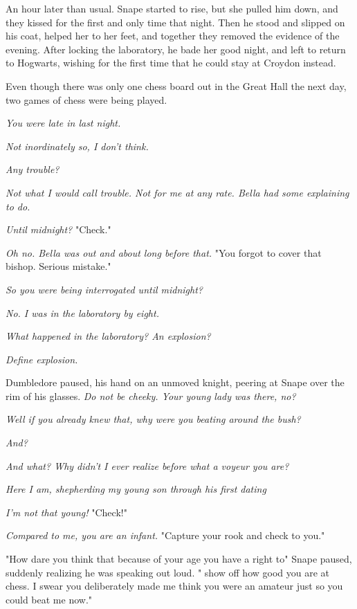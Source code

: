 An hour later than usual. Snape started to rise, but she pulled him down, and they kissed for the first and only time that night. Then he stood and slipped on his coat, helped her to her feet, and together they removed the evidence of the evening. After locking the laboratory, he bade her good night, and left to return to Hogwarts, wishing for the first time that he could stay at Croydon instead.

Even though there was only one chess board out in the Great Hall the next day, two games of chess were being played.

\emph{You were late in last night.}

\emph{Not inordinately so, I don't think.}

\emph{Any trouble?}

\emph{Not what I would call trouble. Not for me at any rate. Bella had some explaining to do.}

\emph{Until midnight?} "Check."

\emph{Oh no. Bella was out and about long before that.} "You forgot to cover that bishop. Serious mistake."

\emph{So you were being interrogated until midnight?}

\emph{No. I was in the laboratory by eight.}

\emph{What happened in the laboratory? An explosion?}

\emph{Define explosion.}

Dumbledore paused, his hand on an unmoved knight, peering at Snape over the rim of his glasses. \emph{Do not be cheeky. Your young lady was there, no?}

\emph{Well if you already knew that, why were you beating around the bush?}

\emph{And?}

\emph{And what? Why didn't I ever realize before what a voyeur you are?}

\emph{Here I am, shepherding my young son through his first dating{\el}}

\emph{I'm not that young!} "Check!"

\emph{Compared to me, you are an infant.} "Capture your rook and check to you."

"How dare you think that because of your age you have a right to{\el}" Snape paused, suddenly realizing he was speaking out loud. "{\el} show off how good you are at chess. I swear you deliberately made me think you were an amateur just so you could beat me now."

